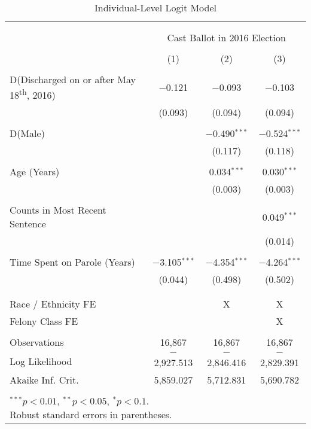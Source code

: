 \documentclass[
  12pt,
]{article}
\begin{document}
\begin{singlespace}
\begin{table}[H] \centering
\fontsize{10}{12}\selectfont
\caption{\label{tab:to-16-logit} Individual-Level Logit Model}
\label{}
\begin{tabular}{@{\extracolsep{5pt}}lccc}
\\[-1.8ex]\hline \\[-1.8ex]
\\[-1.8ex] & \multicolumn{3}{c}{Cast Ballot in 2016 Election} \\
\\[-1.8ex] & (1) & (2) & (3)\\
\hline \\[-1.8ex]
D(Discharged on or after May 18\textsuperscript{th}, 2016) & $-$0.121 & $-$0.093 & $-$0.103 \\
& (0.093) & (0.094) & (0.094) \\
& & & \\
D(Male) &  & $-$0.490$^{***}$ & $-$0.524$^{***}$ \\
&  & (0.117) & (0.118) \\
& & & \\
Age (Years) &  & 0.034$^{***}$ & 0.030$^{***}$ \\
&  & (0.003) & (0.003) \\
& & & \\
Counts in Most Recent Sentence &  &  & 0.049$^{***}$ \\
&  &  & (0.014) \\
& & & \\
Time Spent on Parole (Years) & $-$3.105$^{***}$ & $-$4.354$^{***}$ & $-$4.264$^{***}$ \\
& (0.044) & (0.498) & (0.502) \\
& & & \\
\hline \\[-1.8ex]
Race / Ethnicity FE &  & X & X \\
Felony Class FE &  &  & X \\
\hline \\[-1.8ex]
Observations & 16,867 & 16,867 & 16,867 \\
Log Likelihood & $-$2,927.513 & $-$2,846.416 & $-$2,829.391 \\
Akaike Inf. Crit. & 5,859.027 & 5,712.831 & 5,690.782 \\
\hline \\[-1.8ex]
\multicolumn{4}{l}{\scriptsize{\parbox{.5\linewidth}{\vspace{2pt}$^{***}p<0.01$, $^{**}p<0.05$, $^*p<0.1$. \\Robust standard errors in parentheses.}}}
\end{tabular}
\end{table}

\end{singlespace}
\end{document}
